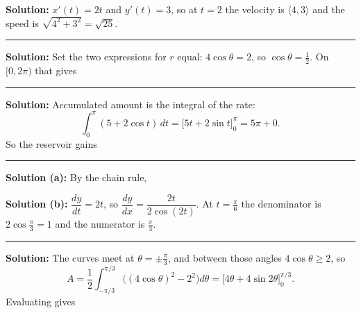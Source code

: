 \documentclass[12pt]{article}
\begin{document}



\textbf{Solution:} $x'(t) = 2t$ and $y'(t) = 3$, so at $t = 2$ the velocity is $\langle 4, 3\rangle$ and the speed is $\sqrt{4^2 + 3^2} = \sqrt{25}$. 

\vspace{0.2cm}\noindent\rule{\linewidth}{0.2pt}\vspace{0.2cm}

\problem{Where do $r = 2$ and $r = 4\cos\theta$ meet, for $\theta$ in $[0, 2\pi)$?}

\textbf{Solution:} Set the two expressions for $r$ equal: $4\cos\theta = 2$, so $\cos\theta = \tfrac{1}{2}$. On $[0, 2\pi)$ that gives 

\vspace{0.2cm}\noindent\rule{\linewidth}{0.2pt}\vspace{0.2cm}


\textbf{Solution:} Accumulated amount is the integral of the rate:
\[ \int_0^{\pi} (5 + 2\cos t)\,dt = \Big[5t + 2\sin t\Big]_0^{\pi} = 5\pi + 0. \]
So the reservoir gains 

\vspace{0.2cm}\noindent\rule{\linewidth}{0.2pt}\vspace{0.2cm}


\textbf{Solution (a):} By the chain rule, 

\textbf{Solution (b):} $\dfrac{dy}{dt} = 2t$, so $\dfrac{dy}{dx} = \dfrac{2t}{2\cos(2t)}$. At $t = \frac{\pi}{6}$ the denominator is $2\cos\frac{\pi}{3} = 1$ and the numerator is $\frac{\pi}{3}$. 

\vspace{0.2cm}\noindent\rule{\linewidth}{0.2pt}\vspace{0.2cm}


\textbf{Solution:} The curves meet at $\theta = \pm\frac{\pi}{3}$, and between those angles $4\cos\theta \ge 2$, so
\[ A = \frac{1}{2}\int_{-\pi/3}^{\pi/3}\Big((4\cos\theta)^2 - 2^2\Big)d\theta
     = \Big[4\theta + 4\sin 2\theta\Big]_{0}^{\pi/3}. \]
Evaluating gives 
\end{document}
